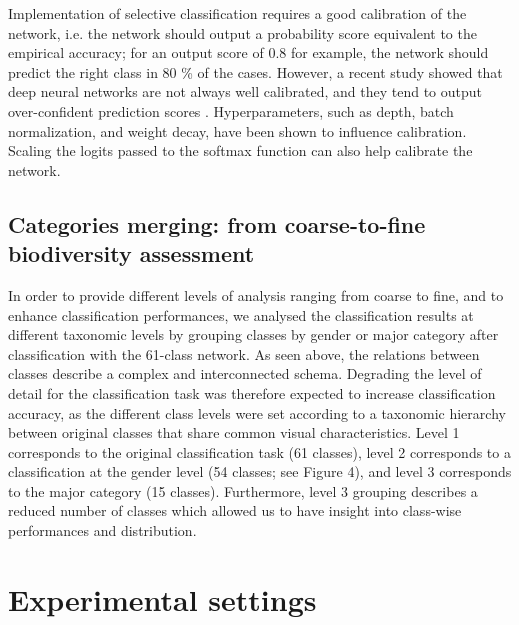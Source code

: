 Implementation of selective classification requires a good calibration of the network, i.e. the network should output a probability score equivalent to the empirical accuracy; for an output score of 0.8 for example, the network should predict the right class in 80 \% of the cases. However, a recent study showed that deep neural networks are not always well calibrated, and they tend to output over-confident prediction scores \citep{guo_calibration_2017}. Hyperparameters, such as depth, batch normalization, and weight decay, have been shown to influence calibration. Scaling the logits passed to the softmax function can also help calibrate the network.


\subsection{Categories merging: from coarse-to-fine biodiversity assessment}\label{chapitre1_4.5}
In order to provide different levels of analysis ranging from coarse to fine, and to enhance classification performances, we analysed the classification results at different taxonomic levels by grouping classes by gender or major category after classification with the 61-class network. As seen above, the relations between classes describe a complex and interconnected schema. Degrading the level of detail for the classification task was therefore expected to increase classification accuracy, as the different class levels were set according to a taxonomic hierarchy between original classes that share common visual characteristics. Level 1 corresponds to the original classification task (61 classes), level 2 corresponds to a classification at the gender level (54 classes; see Figure 4), and level 3 corresponds to the major category (15 classes). Furthermore, level 3 grouping describes a reduced number of classes which allowed us to have insight into class-wise performances and distribution.

\section{Experimental settings}\label{chapitre1_5}

